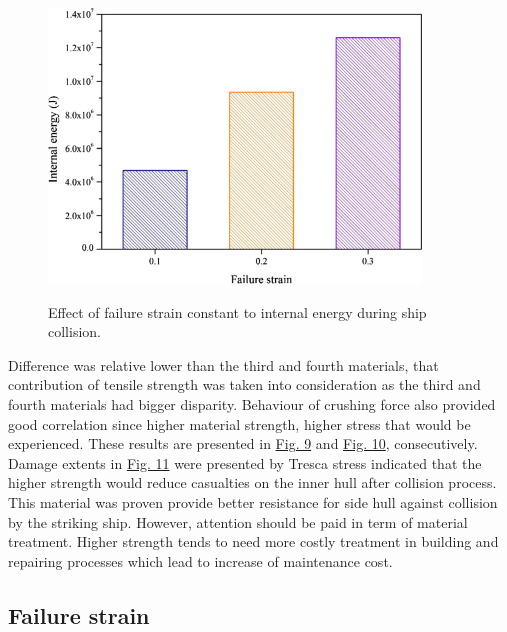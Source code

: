\documentclass[../Final.tex]{subfiles}
\begin{document}
    
\begin{figure}[ht]
    \centering
    \includegraphics[width=\columnwidth]{fig12.jpg}
    \label{fig12}
    \caption{Effect of failure strain constant to internal energy during ship collision.}
\end{figure}

Difference was relative lower than the third and fourth materials, that contribution of tensile strength was taken into consideration as the third and fourth materials had bigger disparity. 
Behaviour of crushing force also provided good correlation since higher material strength, higher stress that would be experienced. These results are presented in \hyperref[fig9]{Fig. 9} and \hyperref[fig10]{Fig. 10}, consecutively. 
Damage extents in \hyperref[fig11]{Fig. 11} were presented by Tresca stress indicated that the higher strength would reduce casualties on the inner hull after collision process. 
This material was proven provide better resistance for side hull against collision by the striking ship. However, attention should be paid in term of material treatment. 
Higher strength tends to need more costly treatment in building and repairing processes which lead to increase of maintenance cost. 

\subsection{Failure strain}
\end{document}

